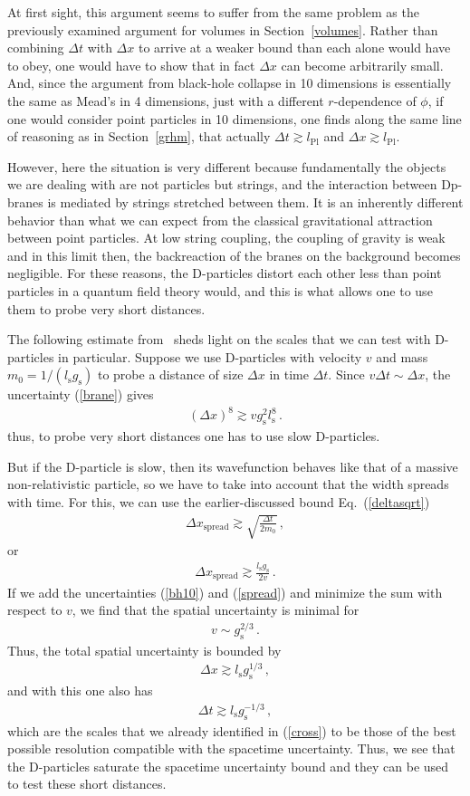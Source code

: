\documentclass{article}
\def\beqn{\begin{eqnarray}}
\def\eeqn{\end{eqnarray}}
\begin{document}
At first sight, this argument seems to suffer from the same problem as the previously examined argument for
volumes in Section~\ref{volumes}. Rather than combining $\Delta t$ with $\Delta x$ to arrive at a weaker
bound than each alone would have to obey, one would have to show that in fact $\Delta x$ can become 
arbitrarily small. And, since the argument
from black-hole collapse in 10 dimensions is essentially the same as Mead's in 4 dimensions, just with a different $r$-dependence
of $\phi$, if one would consider point particles in 10 dimensions, one finds along the same 
line of reasoning as in Section~\ref{grhm}, that actually $\Delta t \gtrsim l_{\mathrm{Pl}}$ and $\Delta x \gtrsim l_{\mathrm{Pl}}$. 

However, here the situation is very different because fundamentally the objects we are dealing with
are not particles but strings, and the interaction between Dp-branes is mediated by strings stretched
between them. It is an inherently different behavior than what we can expect from the classical gravitational
attraction between point particles. 
At low string coupling, the coupling of gravity is weak and in this limit then, the backreaction 
of the branes on the background becomes negligible. For these reasons, the D-particles distort each other 
less than point particles in a quantum field theory would, and this is what allows one to use them 
to probe very short distances.

The following estimate from~\cite{Yoneya:2000bt} sheds light on the scales that we can test with D-particles
in particular. Suppose we use D-particles with velocity $v$ and mass $m_0=1/(l_{\mathrm{s}} g_{\mathrm{s}})$
to probe a distance of size $\Delta x$ in time $\Delta t$. Since $v \Delta t \sim \Delta x$, the uncertainty (\ref{brane}) gives
\beqn
(\Delta x )^8 \gtrsim v g_{\mathrm{s}}^2 l_{\mathrm{s}}^8 \,. \label{bh10}
\eeqn
thus, to probe very short distances one has to use slow D-particles. 

But if the D-particle is slow, then its wavefunction behaves like
that of a massive non-relativistic particle, so we have to take into account that the width spreads with time. For this, 
we can use the earlier-discussed bound Eq.~(\ref{deltasqrt})
\beqn
\Delta x_{\mathrm{spread}} \gtrsim \sqrt{\frac{\Delta t}{2m_0}} \,,
\eeqn
or
\beqn
\Delta x_{\mathrm{spread}} \gtrsim \frac{l_{\mathrm{s}} g_{\mathrm{s}}}{2 v} \,. \label{spread}
\eeqn
If we add the uncertainties (\ref{bh10}) and (\ref{spread}) and minimize the sum with respect to $v$, we find
that the spatial uncertainty is minimal for
\beqn
v \sim g_{\mathrm{s}}^{2/3} \,.
\eeqn
Thus, the total spatial uncertainty is bounded by
\beqn
\Delta x \gtrsim l_{\mathrm{s}} g_{\mathrm{s}}^{1/3} \,,
\eeqn
and with this one also has 
\beqn
\Delta t \gtrsim l_{\mathrm{s}} g_{\mathrm{s}}^{-1/3} \,,
\eeqn
which are the scales that we already identified in (\ref{cross}) to be those of the best possible resolution
compatible with the spacetime uncertainty. Thus, we see that the D-particles saturate the spacetime 
uncertainty bound and they can be used to test these short distances.
 
\end{document}
